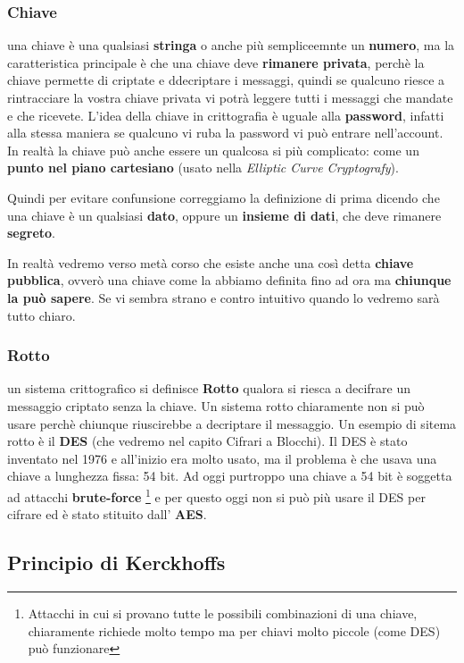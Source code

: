 \documentclass{report}
\begin{document}
\subsubsection{Chiave} una chiave è una qualsiasi \textbf{stringa} o anche più sempliceemnte un \textbf{numero}, ma la caratteristica principale è che una chiave deve \textbf{rimanere privata}, perchè la chiave permette di criptate e ddecriptare i messaggi, quindi se qualcuno riesce a rintracciare la vostra chiave privata vi potrà leggere tutti i messaggi che mandate e che ricevete. L'idea della chiave in crittografia è uguale alla \textbf{password}, infatti alla stessa maniera se qualcuno vi ruba la password vi può entrare nell'account. In realtà la chiave può anche essere un qualcosa si più complicato: come un \textbf{punto nel piano cartesiano} (usato nella \textit{Elliptic Curve Cryptografy}). 

Quindi per evitare confunsione correggiamo la definizione di prima dicendo che una chiave è un qualsiasi \textbf{dato}, oppure un \textbf{insieme di dati},  che deve rimanere \textbf{segreto}.

In realtà vedremo verso metà corso che esiste anche una così detta \textbf{chiave pubblica}, ovverò una chiave come la abbiamo definita fino ad ora ma \textbf{chiunque la può sapere}. Se vi sembra strano e contro intuitivo quando lo vedremo sarà tutto chiaro.

\subsubsection{Rotto} un sistema crittografico si definisce \textbf{Rotto} qualora si riesca a decifrare un messaggio criptato senza la chiave. Un sistema rotto chiaramente non si può usare perchè chiunque riuscirebbe a decriptare il messaggio. Un esempio di sitema rotto è il \textbf{DES} (che vedremo nel capito Cifrari a Blocchi). Il DES è stato inventato nel 1976 e all'inizio era molto usato, ma il problema è che usava una chiave a lunghezza fissa: 54 bit. Ad oggi purtroppo una chiave a 54 bit è soggetta ad attacchi \textbf{brute-force} \footnote{Attacchi in cui si provano tutte le possibili combinazioni di una chiave, chiaramente richiede molto tempo ma per chiavi molto piccole (come DES) può funzionare} e per questo oggi non si può più usare il DES per cifrare ed è stato stituito dall' \textbf{AES}.





\newpage

\subsection{Principio di Kerckhoffs}
\end{document}
